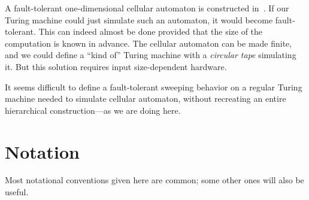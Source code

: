\documentclass[12pt]{memoir}
\begin{document}
A fault-tolerant one-dimensional cellular automaton is constructed
in~\cite{GacsSorg01}.
If our Turing machine could just simulate such an automaton, it would become
fault-tolerant.
This can indeed almost be done provided that the size of the computation is known in advance.
The cellular automaton can be made finite, and we could define
a ``kind of'' Turing machine with a \emph{circular tape} simulating it.
But this solution requires input size-dependent hardware.

It seems difficult to define a fault-tolerant sweeping 
behavior on a regular Turing machine needed to 
simulate cellular automaton, without recreating
an entire hierarchical construction---as we are doing here.


\section{Notation}\label{sec:notation}

Most notational conventions given here are common; some other ones will
also be useful.
\end{document}
